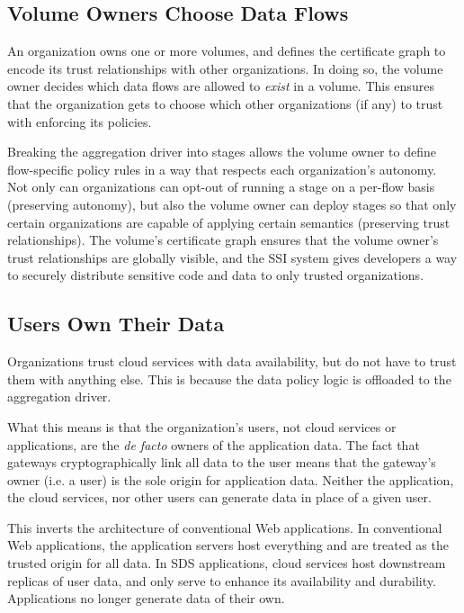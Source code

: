 \subsection{Volume Owners Choose Data Flows}

An organization owns one or more volumes, and defines the certificate graph to
encode its trust relationships with other organizations.  In doing so, the
volume owner decides which data flows are allowed to \emph{exist} in a volume.
This ensures that the organization gets to choose which other organizations (if
any) to trust with enforcing its policies.

Breaking the aggregation driver into stages allows the volume owner to define
flow-specific policy rules in a way that respects each organization's
autonomy.  Not only can organizations can opt-out of running a
stage on a per-flow basis (preserving autonomy), but also the volume owner can deploy
stages so that only certain organizations are capable of applying certain
semantics (preserving trust relationships).  The volume's certificate graph
ensures that the volume owner's trust relationships are globally visible, and the SSI
system gives developers a way to securely distribute sensitive code and data to
only trusted organizations.

\subsection{Users Own Their Data}

Organizations trust cloud services with data availability, but do not have to
trust them with anything else.  This is because the data policy logic is
offloaded to the aggregation driver.

What this means is that the organization's users, not cloud services or
applications, are the \emph{de facto} owners of the application data.  The fact that
gateways cryptographically link all data to the user 
means that the gateway's owner (i.e. a user) is the sole origin for
application data.  Neither the application, the cloud services, nor other users
can generate data in place of a given user.

This inverts the architecture of conventional Web applications.  In conventional
Web applications, the application servers host everything and are treated as the
trusted origin for all data.  In SDS
applications, cloud services host downstream replicas of user data,
and only serve to enhance its availability and durability.  Applications
no longer generate data of their own.

